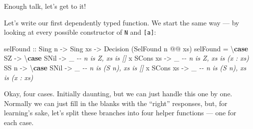 \documentclass[]{article}
\newenvironment{Shaded}{}{}
\newcommand{\CommentTok}[1]{\textcolor[rgb]{0.38,0.63,0.69}{\textit{#1}}}
\newcommand{\DataTypeTok}[1]{\textcolor[rgb]{0.56,0.13,0.00}{#1}}
\newcommand{\KeywordTok}[1]{\textcolor[rgb]{0.00,0.44,0.13}{\textbf{#1}}}
\newcommand{\NormalTok}[1]{#1}
\newcommand{\OperatorTok}[1]{\textcolor[rgb]{0.40,0.40,0.40}{#1}}
\newcommand{\OtherTok}[1]{\textcolor[rgb]{0.00,0.44,0.13}{#1}}
\begin{document}
Enough talk, let's get to it!

Let's write our first dependently typed function. We start the same way --- by
looking at every possible constructor of \texttt{N} and \texttt{{[}a{]}}:

\begin{Shaded}
\begin{Highlighting}[]
\NormalTok{selFound}
\OtherTok{    ::} \DataTypeTok{Sing}\NormalTok{ n}
    \OtherTok{{-}\textgreater{}} \DataTypeTok{Sing}\NormalTok{ xs}
    \OtherTok{{-}\textgreater{}} \DataTypeTok{Decision}\NormalTok{ (}\DataTypeTok{SelFound}\NormalTok{ n }\OperatorTok{@@}\NormalTok{ xs)}
\NormalTok{selFound }\OtherTok{=}\NormalTok{ \textbackslash{}}\KeywordTok{case}
    \DataTypeTok{SZ} \OtherTok{{-}\textgreater{}}\NormalTok{ \textbackslash{}}\KeywordTok{case}
      \DataTypeTok{SNil}         \OtherTok{{-}\textgreater{}}\NormalTok{ \_   }\CommentTok{{-}{-} n is \textquotesingle{}Z, xs is \textquotesingle{}[]}
\NormalTok{      x }\OtherTok{\textasciigrave{}SCons\textasciigrave{}}\NormalTok{ xs }\OtherTok{{-}\textgreater{}}\NormalTok{ \_   }\CommentTok{{-}{-} n is \textquotesingle{}Z, xs is (x \textquotesingle{}: xs)}
    \DataTypeTok{SS}\NormalTok{ n }\OtherTok{{-}\textgreater{}}\NormalTok{ \textbackslash{}}\KeywordTok{case}
      \DataTypeTok{SNil}         \OtherTok{{-}\textgreater{}}\NormalTok{ \_   }\CommentTok{{-}{-} n is (\textquotesingle{}S n), xs is \textquotesingle{}[]}
\NormalTok{      x }\OtherTok{\textasciigrave{}SCons\textasciigrave{}}\NormalTok{ xs }\OtherTok{{-}\textgreater{}}\NormalTok{ \_   }\CommentTok{{-}{-} n is (\textquotesingle{}S n), xs is (x \textquotesingle{}: xs)}
\end{Highlighting}
\end{Shaded}

Okay, four cases. Initially daunting, but we can just handle this one by one.
Normally we can just fill in the blanks with the ``right'' responses, but, for
learning's sake, let's split these branches into four helper functions --- one
for each case.
\end{document}
